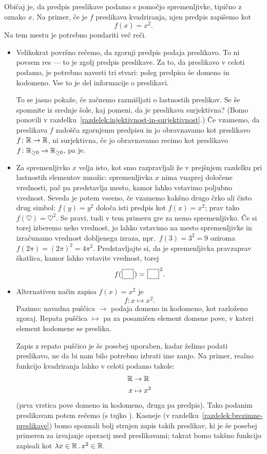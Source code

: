 Običaj je, da predpis preslikave podamo s pomočjo spremenljivke, tipično z oznako $x$. Na primer, če je $f$ preslikava kvadriranja, njen predpis zapišemo kot
\[f(x) = x^2.\]
Na tem mestu je potrebno poudariti več reči.
\begin{itemize}
\item
Velikokrat površno rečemo, da zgornji predpis podaja preslikavo. To ni povsem res --- to je zgolj predpis preslikave. Za to, da preslikavo v celoti podamo, je potrebno navesti tri stvari: poleg predpisa še domeno in kodomeno. Vse to je del informacije o preslikavi.

To se jasno pokaže, če začnemo razmišljati o lastnostih preslikav. Se še spomnite iz srednje šole, kaj pomeni, da je preslikava surjektivna? (Bomo ponovili v razdelku~\ref{razdelek:injektivnost-in-surjektivnost}.) Če vzamemo, da preslikava $f$ zadošča zgornjemu predpisu in jo obravnavamo kot preslikavo $f\colon \mathbb{R} \to \mathbb{R}$, ni surjektivna, če jo obravnavamo recimo kot preslikavo $f\colon \mathbb{R}_{\geq 0} \to \mathbb{R}_{\geq 0}$, pa je.
\item
Za spremenljivko $x$ velja isto, kot smo razpravljali že v prejšnjem razdelku pri lastnostih elementov množic: spremenljivka $x$ nima vnaprej določene vrednosti, pač pa predstavlja mesto, kamor lahko vstavimo poljubno vrednost. Seveda je potem vseeno, če vzamemo kakšno drugo črko ali čisto drug simbol: $f(y) = y^2$ določa isti predpis kot $f(x) = x^2$; prav tako $f(\heartsuit) = \heartsuit^2$. Se pravi, tudi v tem primeru gre za nemo spremenljivko. Če si torej izberemo neko vrednost, jo lahko vstavimo na mesto spremenljivke in izračunamo vrednost dobljenega izraza, npr.~$f(3) = 3^2 = 9$ oziroma $f(2\pi) = (2\pi)^2 = 4\pi^2$. Predstavljajte si, da je spremenljivka pravzaprav škatlica, kamor lahko vstavite vrednost, torej
\[f(\argbox) = \argbox^2.\]
\item
Alternativen način zapisa $f(x) = x^2$ je
\[f\colon x \mapsto x^2.\]
Pazimo: navadna puščica $\to$ podaja domeno in kodomeno, kot razloženo zgoraj. Repata puščica $\mapsto$ pa za posamičen element domene pove, v kateri element kodomene se preslika.

Zapis z repato puščico je še posebej uporaben, kadar želimo podati preslikavo, ne da bi nam bilo potrebno izbrati ime zanjo. Na primer, realno funkcijo kvadriranja lahko v celoti podamo takole:
\begin{align*}
\mathbb{R} &\to \mathbb{R} \\
x &\mapsto x^2
\end{align*}
(prva vrstica pove domeno in kodomeno, druga pa predpis). Tako podanim preslikavam potem rečemo  (s tujko ). Kasneje (v razdelku~\ref{razdelek:brezimne-preslikave}) bomo spoznali bolj strnjen zapis takih preslikav, ki je še posebej primeren za izvajanje operacij med preslikavami; takrat bomo takšno funkcijo zapisali kot $\xlam{x}[\RR]{x^2}[\RR]$.
\end{itemize}

